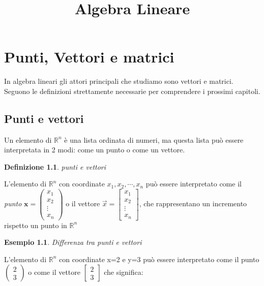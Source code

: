 \documentclass{report}
\title{Algebra Lineare}
\newtheorem{definizione}{\textbf{Definizione}}[section]
\newtheorem{esempio}{Esempio}[section]
\begin{document}
\maketitle

\chapter{Punti, Vettori e matrici}
In algebra lineari gli attori principali che studiamo sono vettori e matrici. Seguono le definizioni strettamente necessarie per comprendere i prossimi capitoli.
\section{Punti e vettori}
Un elemento di \(\mathbb{R}^n\) è una lista ordinata di numeri, ma questa lista può essere interpretata in 2 modi: come un punto o come un vettore.
\begin{tcolorbox}
  \begin{definizione}
    punti e vettori
  \end{definizione}
  L'elemento di \(\mathbb{R}^n\) con coordinate \(x_1,x_2,\cdots, x_n\) può essere interpretato come il \textit{punto} \(\textbf{x}= \begin{pmatrix}
    x_1\\
    x_2\\
    \vdots\\
    x_n
 \end{pmatrix}
 \) o il vettore \(\vec{x}=\begin{bmatrix}
   x_1\\
   x_2\\
   \vdots\\
   x_n
 \end{bmatrix}
 \), che rappresentano un incremento rispetto un punto in \(\mathbb{R}^n\)
\end{tcolorbox}

\begin{esempio}Differenza tra punti e vettori \end{esempio} L'elemento di \(\mathbb{R}^n\) con coordinate x=2 e y=3 può essere interpretato come il punto \(\begin{pmatrix}
    2\\
    3

  \end{pmatrix}\) o come il vettore \(\begin{bmatrix}
    2\\
    3
  \end{bmatrix}
  \) che significa:
\end{document}
